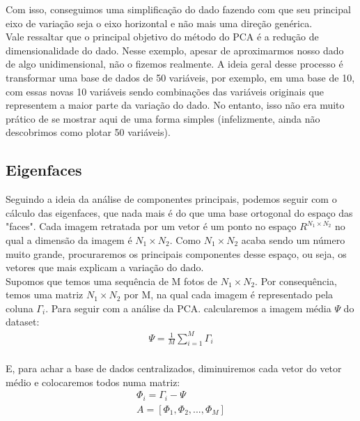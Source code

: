 \documentclass{article}
\begin{document}
Com isso, conseguimos uma simplificação do dado fazendo com que seu principal eixo de variação seja o eixo horizontal e não mais uma direção genérica. \\

Vale ressaltar que o principal objetivo do método do PCA é a redução de dimensionalidade do dado. Nesse exemplo, apesar de aproximarmos nosso dado de algo unidimensional, não o fizemos realmente. A ideia geral desse processo é transformar uma base de dados de 50 variáveis, por exemplo, em uma base de 10, com essas novas 10 variáveis sendo combinações das variáveis originais que representem a maior parte da variação do dado. No entanto, isso não era muito prático de se mostrar aqui de uma forma simples (infelizmente, ainda não descobrimos como plotar 50 variáveis). \\

\subsection{Eigenfaces}
Seguindo a ideia da análise de componentes principais, podemos seguir com o cálculo das eigenfaces, que nada mais é do que uma base ortogonal do espaço das "faces". Cada imagem retratada por um vetor é um ponto no espaço $R^{N_{1}\times N_{2}}$ no qual a dimensão da imagem é ${N_{1}\times N_{2}}$. Como ${N_{1}\times N_{2}}$ acaba sendo um número muito grande, procuraremos os principais componentes desse espaço, ou seja, os vetores que mais explicam a variação do dado.\\

Supomos que temos uma sequência de M fotos de ${N_{1}\times N_{2}}$. Por consequência, temos uma matriz ${N_{1}\times N_{2}}$ por M, na qual cada imagem é representado pela coluna $\Gamma_{i}$. Para seguir com a análise da PCA. calcularemos a imagem média $\Psi$ do dataset:\\
\begin{align*}
    \Psi = \frac{1}{M}\sum_{i=1}^{M}\Gamma_{i}
\end{align*} \\

E, para achar a base de dados centralizados, diminuiremos cada vetor do vetor médio e colocaremos todos numa matriz:\\

\begin{gather*}
    \Phi_{i} = \Gamma_{i}-\Psi \\
    A = [\Phi_{1}, \Phi_{2}, ..., \Phi_{M}]
\end{gather*}\\
\end{document}
